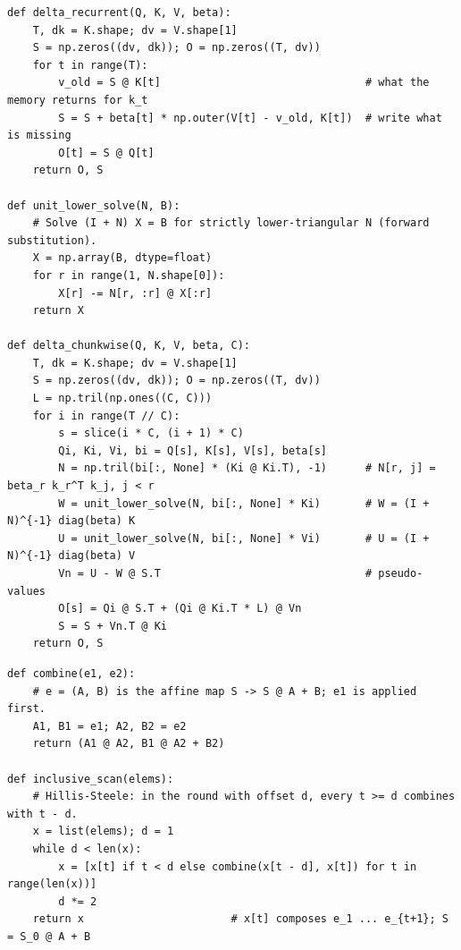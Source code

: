 \begin{lstlisting}[caption={Reference implementation (ours): the delta rule, recurrent and chunkwise via the WY representation / UT transform (\cref{alg:c03-delta-chunk}).},label={lst:c03-ours-delta}]
def delta_recurrent(Q, K, V, beta):
    T, dk = K.shape; dv = V.shape[1]
    S = np.zeros((dv, dk)); O = np.zeros((T, dv))
    for t in range(T):
        v_old = S @ K[t]                                # what the memory returns for k_t
        S = S + beta[t] * np.outer(V[t] - v_old, K[t])  # write what is missing
        O[t] = S @ Q[t]
    return O, S

def unit_lower_solve(N, B):
    # Solve (I + N) X = B for strictly lower-triangular N (forward substitution).
    X = np.array(B, dtype=float)
    for r in range(1, N.shape[0]):
        X[r] -= N[r, :r] @ X[:r]
    return X

def delta_chunkwise(Q, K, V, beta, C):
    T, dk = K.shape; dv = V.shape[1]
    S = np.zeros((dv, dk)); O = np.zeros((T, dv))
    L = np.tril(np.ones((C, C)))
    for i in range(T // C):
        s = slice(i * C, (i + 1) * C)
        Qi, Ki, Vi, bi = Q[s], K[s], V[s], beta[s]
        N = np.tril(bi[:, None] * (Ki @ Ki.T), -1)      # N[r, j] = beta_r k_r^T k_j, j < r
        W = unit_lower_solve(N, bi[:, None] * Ki)       # W = (I + N)^{-1} diag(beta) K
        U = unit_lower_solve(N, bi[:, None] * Vi)       # U = (I + N)^{-1} diag(beta) V
        Vn = U - W @ S.T                                # pseudo-values
        O[s] = Qi @ S.T + (Qi @ Ki.T * L) @ Vn
        S = S + Vn.T @ Ki
    return O, S
\end{lstlisting}

\begin{lstlisting}[caption={Reference implementation (ours): the affine scan operator of \cref{eq:c03-scan-op} and the Hillis--Steele scan of \cref{alg:c03-scan}.},label={lst:c03-scan}]
def combine(e1, e2):
    # e = (A, B) is the affine map S -> S @ A + B; e1 is applied first.
    A1, B1 = e1; A2, B2 = e2
    return (A1 @ A2, B1 @ A2 + B2)

def inclusive_scan(elems):
    # Hillis-Steele: in the round with offset d, every t >= d combines with t - d.
    x = list(elems); d = 1
    while d < len(x):
        x = [x[t] if t < d else combine(x[t - d], x[t]) for t in range(len(x))]
        d *= 2
    return x                       # x[t] composes e_1 ... e_{t+1}; S = S_0 @ A + B
\end{lstlisting}

